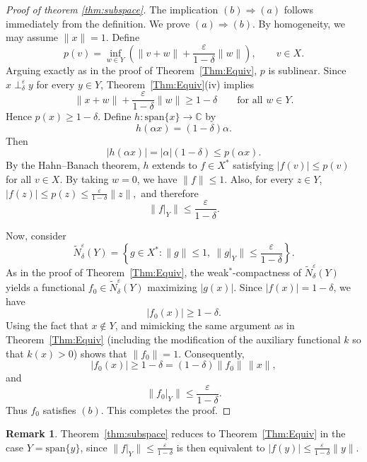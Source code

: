 \documentclass[11pt, reqno]{amsart}
\theoremstyle{definition}
\newtheorem{remark}[theorem]{Remark}
\newcommand{\nperp}{\perp_{\delta}^\varepsilon}
\begin{document}
\begin{proof}[Proof of theorem \ref{thm:subspace}]
The implication  $(b)\Rightarrow(a)$ follows immediately from the
definition. We prove  $(a)\Rightarrow(b)$. By homogeneity, we may assume $\|x\|=1$. Define
\[
p(v)=\inf_{w\in Y}\left(
\|v+w\|
+\frac{\varepsilon}{1-\delta}\|w\|
\right),
\qquad v\in X.
\]
Arguing exactly as in the proof of Theorem~\ref{Thm:Equiv},
$p$ is sublinear. Since $x\nperp y$ for every $y\in Y$, Theorem~\ref{Thm:Equiv}(iv)
implies
\[
\|x+w\|
+
\frac{\varepsilon}{1-\delta}\|w\|
\geq
1-\delta
\qquad \text{for all } w\in Y.
\]
Hence $p(x)\geq 1-\delta$. Define $h:\mathrm{span}\{x\}\to\mathbb{C}$ by
\[
h(\alpha x)=(1-\delta)\alpha.
\]
Then
\[
|h(\alpha x)|
=
|\alpha|(1-\delta)
\leq
p(\alpha x).
\]
By the Hahn--Banach theorem, $h$ extends to
$f\in X^*$ satisfying $|f(v)|\leq p(v)$ for all $v\in X.$ By taking $w=0$, we have $\|f\|\leq 1$. Also, for every $z\in Y$, $|f(z)|\leq p(z)\leq \frac{\varepsilon}{1-\delta}\|z\|,$ and therefore
\[
\|f|_Y\|
\leq
\frac{\varepsilon}{1-\delta}.
\]

\medskip

\noindent Now, consider
\[
\widetilde N_\delta^\varepsilon(Y)
=
\left\{
g\in X^*:
\|g\|\le 1,\ 
\|g|_Y\|
\le
\frac{\varepsilon}{1-\delta}
\right\}.
\]
As in the proof of Theorem~\ref{Thm:Equiv}, the weak$^*$-compactness
of $\widetilde N_\delta^\varepsilon(Y)$ yields a functional
$f_0\in \widetilde N_\delta^\varepsilon(Y)$ maximizing $|g(x)|$.
Since $|f(x)|=1-\delta$, we have
\[
|f_0(x)|\geq 1-\delta.
\]
Using the fact that $x\notin Y$, and mimicking the same argument as in
Theorem~\ref{Thm:Equiv}  (including the modification of the auxiliary 
functional $k$ so that $k(x)>0$) shows that $\|f_0\|=1$. Consequently,
\[
|f_0(x)|
\geq
1-\delta
=
(1-\delta)\|f_0\|\,\|x\|,
\]
and
\[
\|f_0|_Y\|
\leq
\frac{\varepsilon}{1-\delta}.
\]
Thus $f_0$ satisfies  $(b)$. This completes the proof.
\end{proof}

\begin{remark}
Theorem~\ref{thm:subspace} reduces to Theorem~\ref{Thm:Equiv} in the case $Y =
\mathrm{span}\{y\}$, since $\|f|_Y\| \leq \frac{\varepsilon}{1-\delta}$ is then equivalent to
$|f(y)| \leq \frac{\varepsilon}{1-\delta}\|y\|$. 
\end{remark}
\end{document}
